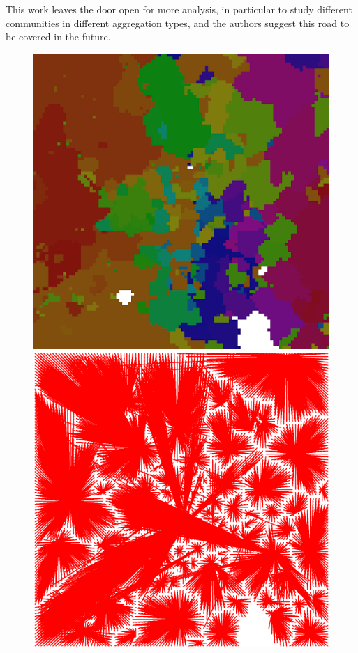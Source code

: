\documentclass[12pt,a4paper]{article}
\begin{document}
This work leaves the door open for more analysis, in particular to study
different communities in different aggregation types, and the authors
suggest this road to be covered in the future.

\begin{figure}[h]
\centering
\includegraphics[scale=0.4]{monday.png}
\caption{}
\label{fig:patch_mon}




\includegraphics[scale=0.2]{clusters.png}
\caption{}
\label{fig:arcs_mon}





\end{figure}
\end{document}
